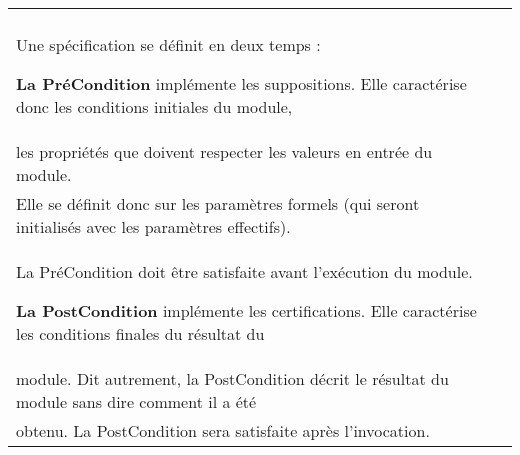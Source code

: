 \documentclass[a4paper, 11pt, oneside]{article}
\begin{document}
	\begin{center}
		\begin{tabular}{|p{17cm}|c}
			\hline
			\\
			Une spécification se définit en deux temps :
			\vspace{3mm}
		
			\textbf{La PréCondition}  implémente les suppositions. Elle caractérise donc les conditions initiales du module,
			\\ les propriétés que doivent respecter les valeurs en entrée du module.
			\\ Elle se définit donc sur les paramètres formels (qui seront initialisés avec les paramètres effectifs). 
			\\ La PréCondition doit être satisfaite avant l’exécution du module.
			
			\vspace{3mm}
			
			\textbf{La PostCondition} implémente les certifications. Elle caractérise les conditions finales du résultat du
			\\ module. Dit autrement, la PostCondition décrit le résultat du module sans dire comment il a été 
			\\ obtenu. La PostCondition sera satisfaite après l’invocation.

			\\
			\hline
		\end{tabular}
	\end{center}
		
	\vspace{5mm}
	
\end{document}
